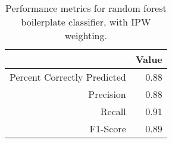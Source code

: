 \begin{table}[ht]
\centering
\begin{tabular}{rr}
  \hline
 & Value \\ 
  \hline
Percent Correctly Predicted & 0.88 \\ 
  Precision & 0.88 \\ 
  Recall & 0.91 \\ 
  F1-Score & 0.89 \\ 
   \hline
\end{tabular}
\caption{Performance metrics for random forest boilerplate classifier, with IPW weighting.} 
\end{table}

